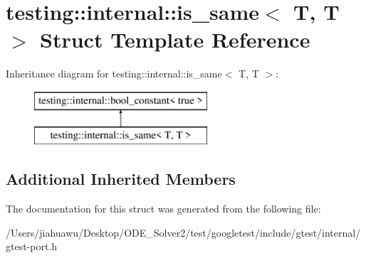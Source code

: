 \hypertarget{structtesting_1_1internal_1_1is__same_3_01_t_00_01_t_01_4}{}\section{testing\+:\+:internal\+:\+:is\+\_\+same$<$ T, T $>$ Struct Template Reference}
\label{structtesting_1_1internal_1_1is__same_3_01_t_00_01_t_01_4}
Inheritance diagram for testing\+:\+:internal\+:\+:is\+\_\+same$<$ T, T $>$\+:\begin{figure}[H]
\begin{center}
\leavevmode
\includegraphics[height=2.000000cm]{structtesting_1_1internal_1_1is__same_3_01_t_00_01_t_01_4}
\end{center}
\end{figure}
\subsection*{Additional Inherited Members}


The documentation for this struct was generated from the following file\+:\begin{DoxyCompactItemize}
\item 
/\+Users/jiahuawu/\+Desktop/\+O\+D\+E\+\_\+\+Solver2/test/googletest/include/gtest/internal/gtest-\/port.\+h\end{DoxyCompactItemize}

